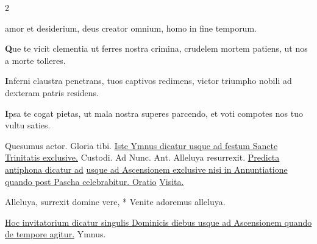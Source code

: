 \begin{multicols*}{2}
{amor et desiderium,
deus creator omnium,
homo in fine temporum.
\par {\bfseries \color{Blue} Q}ue te vicit clementia
ut ferres nostra crimina,
crudelem mortem patiens,
ut nos a morte tolleres.
\par {\bfseries \color{Red} I}nferni claustra penetrans,
tuos captivos redimens,
victor triumpho nobili
ad dexteram patris residens.
\par {\bfseries \color{Blue} I}psa te cogat pietas,
ut mala nostra superes
parcendo, et voti compotes
nos tuo vultu saties.
}
Quesumus actor. Gloria tibi.
\newline \ul{Iste Ymnus dicatur usque ad festum Sancte Trinitatis exclusive.}
\newline \V Custodi. {\color{Red} Ad Nunc. Ant.} Alleluya resurrexit. \ul{Predicta antiphona dicatur ad}  \ul{usque ad Ascensionem exclusive nisi in Annuntiatione quando post Pascha celebrabitur. Oratio} \hyperlink{visita-quesumus}{Visita.}
\begin{invitatory}
{Alleluya, surrexit domine vere, * Venite adoremus alleluya.}
\end{invitatory}
\newline \ul{Hoc invitatorium dicatur singulis Dominicis diebus usque ad Ascensionem quando de tempore agitur.} {\color{Red} Ymnus.}
\end{multicols*}
